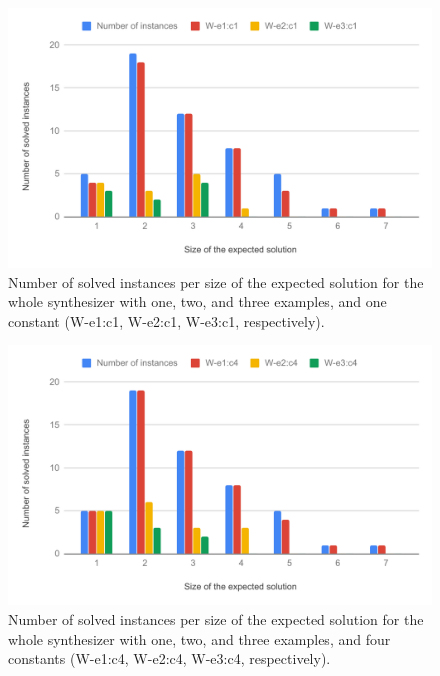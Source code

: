 \begin{figure}
  \centering
  \includegraphics[width=1.0\textwidth]{assets/bar-chart-solved-whole-c1.pdf}
  \caption{Number of solved instances per size of the expected solution for
    the whole synthesizer with one, two, and three examples, and one constant
    (W-e1:c1, W-e2:c1, W-e3:c1, respectively).}
  \label{fig:bar-chart-solved-whole-c1}
\end{figure}

\begin{figure}
  \centering
  \includegraphics[width=1.0\textwidth]{assets/bar-chart-solved-whole-c4.pdf}
  \caption{Number of solved instances per size of the expected solution for
    the whole synthesizer with one, two, and three examples, and four constants
    (W-e1:c4, W-e2:c4, W-e3:c4, respectively).}
  \label{fig:bar-chart-solved-whole-c4}
\end{figure}

